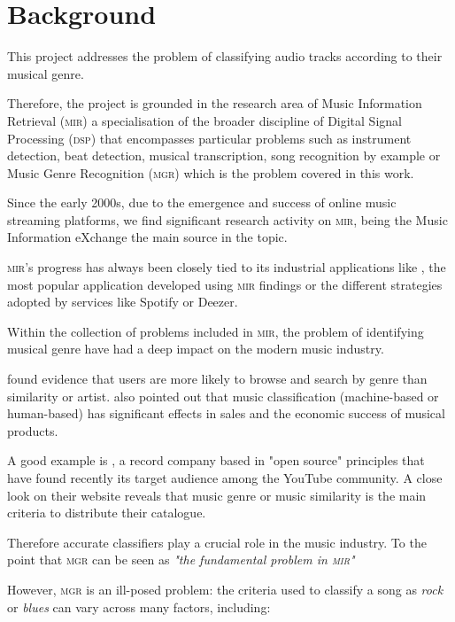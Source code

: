 \label{chap:introduction}
\section{Background} \label{sec:background}

This project addresses the problem of classifying audio tracks according to their musical genre.

Therefore, the project is grounded in the research area of Music Information Retrieval (\textsc{mir}) a specialisation of the broader discipline of Digital Signal Processing (\textsc{dsp}) that encompasses particular problems such as  instrument detection,  beat detection, musical transcription, song  recognition by example \citep{pascar} or Music Genre Recognition (\textsc{\textsc{mgr}}) \citep{tandcook} which is the problem covered in this work.

Since the early 2000s, due to the emergence and success of online music streaming platforms, we find significant research activity on \textsc{mir}, being the Music Information eXchange \citep{mirex} the main source in the topic.

\textsc{mir}'s progress has always been closely tied to its industrial applications like \citet{shazam}, the most popular application developed using \textsc{mir} findings or the different strategies adopted by services like Spotify or Deezer.

Within the collection of problems included in \textsc{mir}, the problem of identifying musical genre have had a deep impact on the modern music industry.

\citet{homsi} found evidence that users are more likely to browse and search by genre than similarity or artist. \citet{venrooija} also pointed out that music classification (machine-based or human-based) has significant effects in sales and the economic success of musical products.

A good example is \citet{epidemic}, a record company based in "open source" principles that have found recently its target audience among the YouTube community. A close look on their website reveals that music genre or music similarity is the main criteria to distribute their catalogue.

Therefore accurate classifiers play a crucial role in the music industry. To the point that \textsc{mgr} can be seen as {\it "the fundamental problem in \textsc{mir}"}

However, \textsc{\textsc{mgr}} is an ill-posed problem: the criteria used to classify a song as {\it rock} or {\it blues} can vary across many factors, including:

